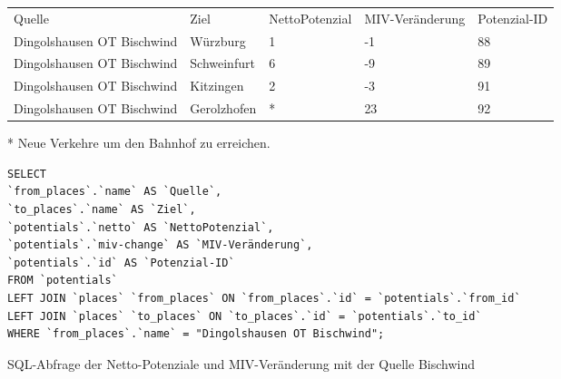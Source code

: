 \begin{tabularx}{\textwidth}{*5{X}}
Quelle & Ziel & NettoPotenzial & MIV-Veränderung & Potenzial-ID\\ 
Dingolshausen OT Bischwind & Würzburg & 1 & -1 & 88\\ 
Dingolshausen OT Bischwind & Schweinfurt & 6 & -9 & 89\\ 
Dingolshausen OT Bischwind & Kitzingen & 2 & -3 & 91\\ 
Dingolshausen OT Bischwind & Gerolzhofen & * & 23 & 92\\ 
\end{tabularx}
\newline
\newline
* Neue Verkehre um den Bahnhof zu erreichen.
\newline
\begin{listing}[htbp]
\begin{verbatim}
SELECT
`from_places`.`name` AS `Quelle`, 
`to_places`.`name` AS `Ziel`, 
`potentials`.`netto` AS `NettoPotenzial`, 
`potentials`.`miv-change` AS `MIV-Veränderung`, 
`potentials`.`id` AS `Potenzial-ID`
FROM `potentials`
LEFT JOIN `places` `from_places` ON `from_places`.`id` = `potentials`.`from_id`
LEFT JOIN `places` `to_places` ON `to_places`.`id` = `potentials`.`to_id`
WHERE `from_places`.`name` = "Dingolshausen OT Bischwind";
\end{verbatim}
\caption{SQL-Abfrage der Netto-Potenziale und MIV-Veränderung mit der Quelle Bischwind}\label{lst-fz-bischwind}
\end{listing}